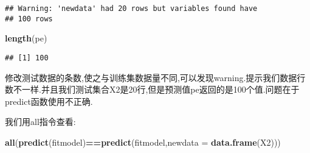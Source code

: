 \documentclass[]{ctexbook}
\newenvironment{Shaded}{\begin{snugshade}}{\end{snugshade}}
\newcommand{\DataTypeTok}[1]{\textcolor[rgb]{0.13,0.29,0.53}{#1}}
\newcommand{\DecValTok}[1]{\textcolor[rgb]{0.00,0.00,0.81}{#1}}
\newcommand{\FloatTok}[1]{\textcolor[rgb]{0.00,0.00,0.81}{#1}}
\newcommand{\KeywordTok}[1]{\textcolor[rgb]{0.13,0.29,0.53}{\textbf{#1}}}
\newcommand{\NormalTok}[1]{#1}
\newcommand{\OperatorTok}[1]{\textcolor[rgb]{0.81,0.36,0.00}{\textbf{#1}}}
\newcommand{\StringTok}[1]{\textcolor[rgb]{0.31,0.60,0.02}{#1}}
\begin{document}
\begin{Shaded}
\end{Shaded}

\begin{verbatim}
## Warning: 'newdata' had 20 rows but variables found have
## 100 rows
\end{verbatim}

\begin{Shaded}
\begin{Highlighting}[]
\KeywordTok{length}\NormalTok{(pe)}
\end{Highlighting}
\end{Shaded}

\begin{verbatim}
## [1] 100
\end{verbatim}

修改测试数据的条数,使之与训练集数据量不同,可以发现warning.提示我们数据行数不一样.并且我们测试集合X2是20行,但是预测值pe返回的是100个值.问题在于predict函数使用不正确.

我们用all指令查看:

\begin{Shaded}
\begin{Highlighting}[]
\KeywordTok{all}\NormalTok{(}\KeywordTok{predict}\NormalTok{(fitmodel)}\OperatorTok{==}\KeywordTok{predict}\NormalTok{(fitmodel,}\DataTypeTok{newdata =} \KeywordTok{data.frame}\NormalTok{(X2)))}
\end{Highlighting}
\end{Shaded}
\end{document}
